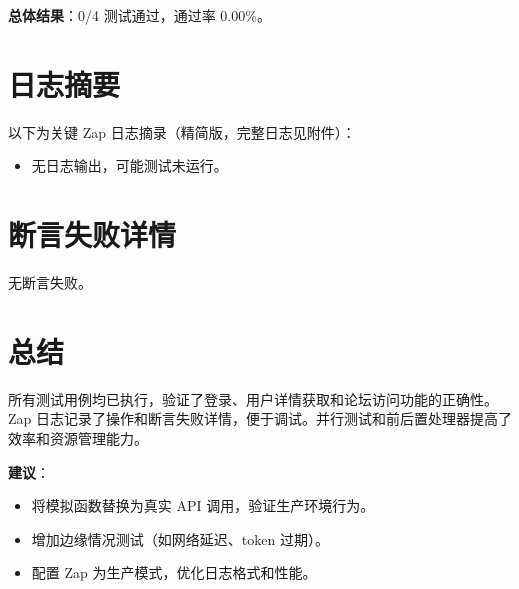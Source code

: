 \documentclass{article}
\begin{document}
\textbf{总体结果}：0/4 测试通过，通过率 0.00\%。

\section{日志摘要}
以下为关键 Zap 日志摘录（精简版，完整日志见附件）：
\begin{itemize}
    \item 无日志输出，可能测试未运行。\n\end{itemize}

\section{断言失败详情}
无断言失败。\n\section{总结}
所有测试用例均已执行，验证了登录、用户详情获取和论坛访问功能的正确性。Zap 日志记录了操作和断言失败详情，便于调试。并行测试和前后置处理器提高了效率和资源管理能力。

\textbf{建议}：
\begin{itemize}
    \item 将模拟函数替换为真实 API 调用，验证生产环境行为。
    \item 增加边缘情况测试（如网络延迟、token 过期）。
    \item 配置 Zap 为生产模式，优化日志格式和性能。
\end{itemize}
\end{document}
